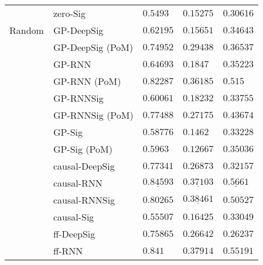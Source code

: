 \begin{tabular}{lllll}
       & zero-Sig &                            $ 0.5493 $ &                           $ 0.15275 $ &                          $ 0.30616 $ \\
Random & GP-DeepSig &                           $ 0.62195 $ &                           $ 0.15651 $ &                          $ 0.34643 $ \\
       & GP-DeepSig (PoM) &                           $ 0.74952 $ &                           $ 0.29438 $ &                          $ 0.36537 $ \\
       & GP-RNN &                           $ 0.64693 $ &                            $ 0.1847 $ &                          $ 0.35223 $ \\
       & GP-RNN (PoM) &                           $ 0.82287 $ &                           $ 0.36185 $ &                            $ 0.515 $ \\
       & GP-RNNSig &                           $ 0.60061 $ &                           $ 0.18232 $ &                          $ 0.33755 $ \\
       & GP-RNNSig (PoM) &                           $ 0.77488 $ &                           $ 0.27175 $ &                          $ 0.43674 $ \\
       & GP-Sig &                           $ 0.58776 $ &                            $ 0.1462 $ &                          $ 0.33228 $ \\
       & GP-Sig (PoM) &                            $ 0.5963 $ &                           $ 0.12667 $ &                          $ 0.35036 $ \\
       & causal-DeepSig &                           $ 0.77341 $ &                           $ 0.26873 $ &                          $ 0.32157 $ \\
       & causal-RNN &  $  \mathbf{ \underline{ 0.84593 }} $ &            $  \underline{ 0.37103 } $ &  $  \mathbf{ \underline{ 0.5661 }} $ \\
       & causal-RNNSig &                           $ 0.80265 $ &  $  \mathbf{ \underline{ 0.38461 }} $ &                          $ 0.50527 $ \\
       & causal-Sig &                           $ 0.55507 $ &                           $ 0.16425 $ &                          $ 0.33049 $ \\
       & ff-DeepSig &                           $ 0.75865 $ &                           $ 0.26642 $ &                          $ 0.26237 $ \\
       & ff-RNN &                 $  \mathbf{ 0.841 } $ &               $  \mathbf{ 0.37914 } $ &              $  \mathbf{ 0.55191 } $ \\

\end{tabular}

